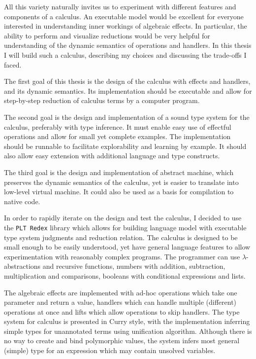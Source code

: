 \documentclass[inz, english, shortabstract]{iithesis}
\newcommand{\Redex}{\texttt{PLT Redex}}
\begin{document}
All this variety naturally invites us to experiment with different features and components of a calculus.
An executable model would be excellent for everyone interested in understanding inner workings of algebraic effects.
In particular, the ability to perform and visualize reductions would be very helpful for understanding of the dynamic semantics of operations and handlers.
In this thesis I will build such a calculus, describing my choices and discussing the trade-offs I faced.

The first goal of this thesis is the design of the calculus with effects and handlers, and its dynamic semantics.
Its implementation should be executable and allow for step-by-step reduction of calculus terms by a computer program.

The second goal is the design and implementation of a sound type system for the calculus, preferably with type inference.
It must enable easy use of effectful operations and allow for small yet complete examples.
The implementation should be runnable to facilitate explorability and learning by example.
It should also allow easy extension with additional language and type constructs.

The third goal is the design and implementation of abstract machine, which preserves the dynamic semantics of the calculus, yet is easier to translate into low-level virtual machine.
It could also be used as a basis for compilation to native code.

In order to rapidly iterate on the design and test the calculus, I decided to use the \Redex{} library which allows for building language model with executable type system judgments and reduction relation.
The calculus is designed to be small enough to be easily understood, yet have general language features to allow experimentation with reasonably complex programs.
The programmer can use $\lambda$-abstractions and recursive functions, numbers with addition, subtraction, multiplication and comparisons, booleans with conditional expressions and lists.

The algebraic effects are implemented with ad-hoc operations which take one parameter and return a value, handlers which can handle multiple (different) operations at once and lifts which allow operations to skip handlers.
The type system for calculus is presented in Curry style, with the implementation inferring simple types for unannotated terms using unification algorithm.
Although there is no way to create and bind polymorphic values, the system infers most general (simple) type for an expression which may contain unsolved variables.
\end{document}
